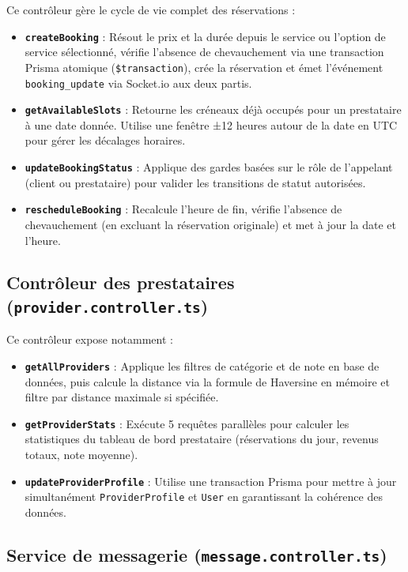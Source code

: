 Ce contrôleur gère le cycle de vie complet des réservations :

\begin{itemize}
    \item \textbf{\texttt{createBooking}} : Résout le prix et la durée depuis le service ou l'option de service sélectionné, vérifie l'absence de chevauchement via une transaction Prisma atomique (\texttt{\$transaction}), crée la réservation et émet l'événement \texttt{booking\_update} via Socket.io aux deux partis.
    \item \textbf{\texttt{getAvailableSlots}} : Retourne les créneaux déjà occupés pour un prestataire à une date donnée. Utilise une fenêtre ±12 heures autour de la date en UTC pour gérer les décalages horaires.
    \item \textbf{\texttt{updateBookingStatus}} : Applique des gardes basées sur le rôle de l'appelant (client ou prestataire) pour valider les transitions de statut autorisées.
    \item \textbf{\texttt{rescheduleBooking}} : Recalcule l'heure de fin, vérifie l'absence de chevauchement (en excluant la réservation originale) et met à jour la date et l'heure.
\end{itemize}

\subsection{Contrôleur des prestataires (\texttt{provider.controller.ts})}

Ce contrôleur expose notamment :

\begin{itemize}
    \item \textbf{\texttt{getAllProviders}} : Applique les filtres de catégorie et de note en base de données, puis calcule la distance via la formule de Haversine en mémoire et filtre par distance maximale si spécifiée.
    \item \textbf{\texttt{getProviderStats}} : Exécute 5 requêtes parallèles pour calculer les statistiques du tableau de bord prestataire (réservations du jour, revenus totaux, note moyenne).
    \item \textbf{\texttt{updateProviderProfile}} : Utilise une transaction Prisma pour mettre à jour simultanément \texttt{ProviderProfile} et \texttt{User} en garantissant la cohérence des données.
\end{itemize}

\subsection{Service de messagerie (\texttt{message.controller.ts})}

